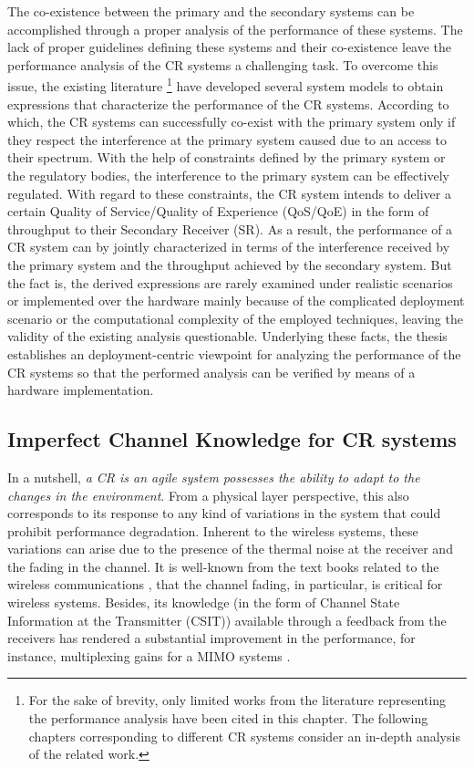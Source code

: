 The co-existence between the primary and the secondary systems can be accomplished through a proper analysis of the performance of these systems. The lack of proper guidelines defining these systems and their co-existence leave the performance analysis of the CR systems a challenging task. To overcome this issue, the existing literature \cite{Liang08, Kang209, Kang09}\footnote{For the sake of brevity, only limited works from the literature representing the performance analysis have been cited in this chapter. The following chapters corresponding to different CR systems consider an in-depth analysis of the related work.} have developed several system models to obtain expressions that characterize the performance of the CR systems. According to which, the CR systems can successfully co-exist with the primary system only if they respect the interference at the primary system caused due to an access to their spectrum. With the help of constraints defined by the primary system or the regulatory bodies, the interference to the primary system can be effectively regulated. With regard to these constraints, the CR system intends to deliver a certain Quality of Service/Quality of Experience (QoS/QoE) in the form of throughput to their Secondary Receiver (SR). As a result, the performance of a CR system can by jointly characterized in terms of the interference received by the primary system and the throughput achieved by the secondary system. 
But the fact is, the derived expressions are rarely examined under realistic scenarios or implemented over the hardware mainly because of the complicated deployment scenario or the computational complexity of the employed techniques, leaving the validity of the existing analysis questionable. Underlying these facts, the thesis establishes an deployment-centric viewpoint for analyzing the performance of the CR systems so that the performed analysis can be verified by means of a hardware implementation. 

\subsection{Imperfect Channel Knowledge for CR systems}

In a nutshell, \textit{a CR is an agile system possesses the ability to adapt to the changes in the environment}. From a physical layer perspective, this also corresponds to its response to any kind of variations in the system that could prohibit performance degradation. Inherent to the wireless systems, these variations can arise due to the presence of the thermal noise at the receiver and the fading in the channel. It is well-known from the text books related to the wireless communications \cite{simon2005, Goldsmith05, Tse05}, that the channel fading, in particular, is critical for wireless systems. Besides, its knowledge (in the form of Channel State Information at the Transmitter (CSIT)) available through a feedback from the receivers has rendered a substantial improvement in the performance, for instance, multiplexing gains for a MIMO systems \cite{Ali12}. 


